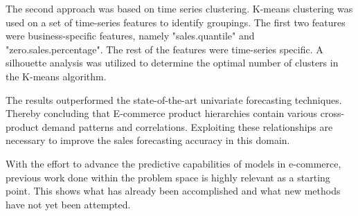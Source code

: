 The second approach was based on time series clustering.
K-means clustering was used on a set of time-series features to identify groupings.
The first two features were business-specific features, namely "sales.quantile" and "zero.sales.percentage".
The rest of the features were time-series specific.
A silhouette analysis was utilized to determine the optimal number of clusters in the K-means algorithm.

The results outperformed the state-of-the-art univariate forecasting techniques.
Thereby concluding that E-commerce product hierarchies contain various cross-product demand
patterns and correlations.
Exploiting these relationships are necessary to improve the sales forecasting
accuracy in this domain.

With the effort to advance the predictive capabilities of models in e-commerce,
previous work done within the problem space is highly relevant as a starting point.
This shows what has already been accomplished and what new methods have not yet been attempted.
